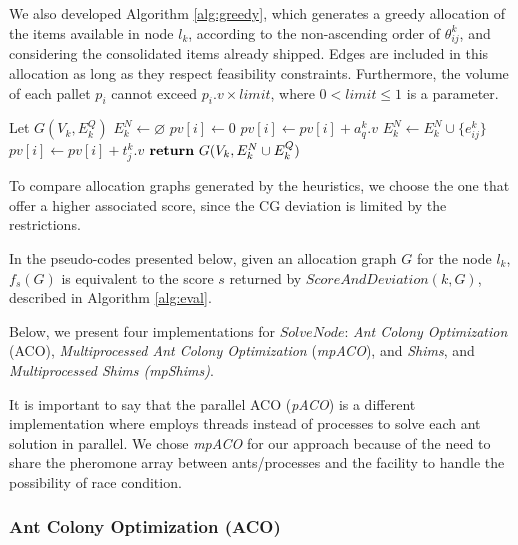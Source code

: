 \documentclass[preprint,authoryear]{elsarticle}
\begin{document}
We also developed Algorithm \ref{alg:greedy}, which generates a greedy allocation of the items available in node $l_k$, according to the non-ascending order of $\theta^k_{ij}$, and considering the consolidated items already shipped. Edges are included in this allocation as long as they respect feasibility constraints. Furthermore, the volume of each pallet $p_i$\/ cannot exceed $p_i.v \times limit$, where $ 0 < limit \leq 1$\/ is a parameter.

\begin{algorithm}[H]
	\caption{ $Greedy(k, G, limit)$}  \label{alg:greedy}

	\begin{algorithmic}[1]
		\State Let $G(V_k, E^Q_k)$
		\State $E^N_k \gets \varnothing$ 			
			\State $pv[i] \gets 0$ 		
		\EndFor
				\State $pv[i] \gets pv[i] + a_q^k.v$ 
			\EndIf		
		\EndFor		
				\State $E^N_k \gets E^N_k \cup \{e_{ij}^k\}$ 
				\State $pv[i] \gets pv[i] + t_j^k.v$ 	
			\EndIf
		\EndFor
		\State ${\bf return}\ G(V_k, E^N_k \cup E^Q_k)$
		
	\end{algorithmic}
\end{algorithm}

To compare allocation graphs generated by the heuristics, we choose the one that offer a higher associated score, since the CG deviation is limited by the restrictions.

In the pseudo-codes presented below, given an allocation graph $G$\/ for the node $l_k$, $f_s(G)$\/ is equivalent to the score $s$\/ returned by $ScoreAndDeviation(k,G) $, described in Algorithm \ref{alg:eval}.

Below, we present four implementations for $SolveNode$: {\it Ant Colony Optimization}\/ (ACO), {\it Multiprocessed Ant Colony Optimization}\/ ({\it mpACO}),  and {\it Shims},  and {\it Multiprocessed Shims (mpShims)}.

It is important to say that the parallel ACO ({\it pACO}) is a different implementation where employs threads instead of processes to solve each ant solution in parallel. We chose {\it mpACO} for our approach because of the need to share the pheromone array between ants/processes and the facility to handle the possibility of race condition.


\subsubsection{Ant Colony Optimization (ACO)}
\end{document}
